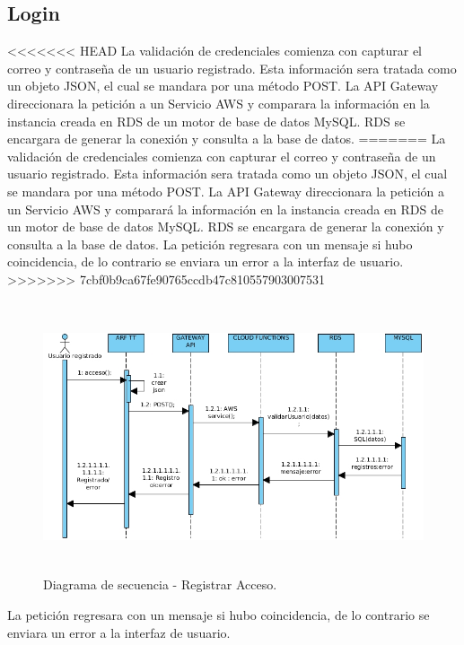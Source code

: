 \subsection{Login}
<<<<<<< HEAD
La validación de credenciales comienza con capturar el correo y contraseña  de un usuario registrado. Esta información sera tratada como un objeto JSON, el cual se mandara por una método POST. La API Gateway direccionara la petición a un Servicio AWS y  comparara la información en la instancia creada en RDS de un motor de base de datos MySQL. RDS se encargara de generar la conexión y consulta a la base de datos.
\vspace{5mm}
=======
La validación de credenciales comienza con capturar el correo y contraseña  de un usuario registrado. Esta información sera tratada como un objeto JSON, el cual se mandara por una método POST. La API Gateway direccionara la petición a un Servicio AWS y  comparará la información en la instancia creada en RDS de un motor de base de datos MySQL. RDS se encargara de generar la conexión y consulta a la base de datos. La petición regresara con un mensaje si hubo coincidencia, de lo contrario se enviara un error a la interfaz de usuario.
>>>>>>> 7cbf0b9ca67fe90765ccdb47c810557903007531
\begin{figure}[h!]
	\centering
	\includegraphics[width=14cm,height=8cm]{imagenes/analisis/DSacceso.jpg}
	\caption{Diagrama de secuencia - Registrar Acceso.}
	\label{fig:analogo}
\end{figure} 
\vspace{5mm} \par
La petición regresara con un mensaje si hubo coincidencia, de lo contrario se enviara un error a la interfaz de usuario.
\newpage
